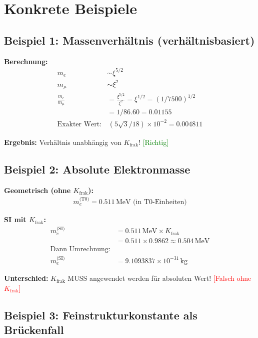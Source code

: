 	\section{Konkrete Beispiele}
	
	\subsection{Beispiel 1: Massenverhältnis (verhältnisbasiert)}
	
	\textbf{Berechnung:}
	\begin{align*}
		m_e &\sim \xi^{5/2} \\
		m_μ &\sim \xi^2 \\
		\frac{m_e}{m_μ} &= \frac{\xi^{5/2}}{\xi^2} = \xi^{1/2} = (1/7500)^{1/2} \\
		&= 1/86.60 = 0.01155 \\
		\text{Exakter Wert:} &\, (5\sqrt{3}/18) \times 10^{-2} = 0.004811
	\end{align*}
	
	\textbf{Ergebnis:} Verhältnis unabhängig von $K_{\text{frak}}$! \textcolor{green}{[Richtig]}
	
	\subsection{Beispiel 2: Absolute Elektronmasse}
	
	\textbf{Geometrisch (ohne $K_{\text{frak}}$):}
	\begin{align*}
		m_e^{\text{(T0)}} = 0.511\,\text{MeV (in T0-Einheiten)}
	\end{align*}
	
	\textbf{SI mit $K_{\text{frak}}$:}
	\begin{align*}
		m_e^{\text{(SI)}} &= 0.511\,\text{MeV} \times K_{\text{frak}} \\
		&= 0.511 \times 0.9862 \approx 0.504\,\text{MeV} \\
		\text{Dann Umrechnung:} & \\
		m_e^{\text{(SI)}} &= 9.1093837 \times 10^{-31}\,\text{kg}
	\end{align*}
	
	\textbf{Unterschied:} $K_{\text{frak}}$ MUSS angewendet werden für absoluten Wert! \textcolor{red}{[Falsch ohne $K_{\text{frak}}$]}
	
	\subsection{Beispiel 3: Feinstrukturkonstante als Brückenfall}
	

